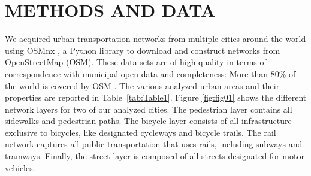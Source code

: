 \section{METHODS AND DATA}
We acquired urban transportation networks from multiple cities around the world using OSMnx \cite{Boeing2017a}, a Python library to download and construct networks from OpenStreetMap (OSM). These data sets are of high quality \cite{Haklay2010b,Girres2010} in terms of correspondence with municipal open data \cite{Ferster2019} and completeness: More than $80\%$ of the world is covered by OSM \cite{Barbosa-Filho2017}.  The various analyzed urban areas and their properties are reported in Table~\ref{tab:Table1}. Figure \ref{fig:fig01} shows the different network layers for two of our analyzed cities. The pedestrian layer contains all sidewalks and pedestrian paths. The bicycle layer consists of all infrastructure exclusive to bicycles, like designated cycleways and bicycle trails. The rail network captures all public transportation that uses rails, including subways and tramways. Finally, the street layer is composed of all streets designated for motor vehicles.

